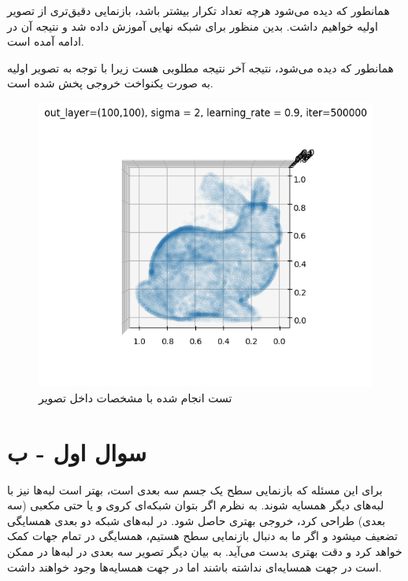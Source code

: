 \documentclass{article}
\begin{document}
\cleardoublepage

همانطور که دیده می‌شود هرچه تعداد تکرار بیشتر باشد، بازنمایی دقیق‌تری از تصویر اولیه خواهیم داشت. بدین منظور برای شبکه نهایی آموزش داده شد و نتیجه آن در ادامه آمده است.

همانطور که دیده می‌شود، نتیجه آخر نتیجه مطلوبی هست زیرا با توجه به تصویر اولیه به صورت یکنواخت خروجی پخش شده است.

\begin{figure}[!h]
    \centering\includegraphics[scale=.65]{./p1-18}
    \caption{تست انجام شده با مشخصات داخل تصویر}\label{fig.118}
\end{figure}

\cleardoublepage

\section{سوال اول - ب}

برای این مسئله که بازنمایی سطح یک جسم سه بعدی است، بهتر است لبه‌ها نیز با لبه‌های دیگر همسایه شوند. به نظرم اگر بتوان شبکه‌ای کروی و یا حتی مکعبی (سه بعدی) طراحی کرد، خروجی بهتری حاصل شود. در لبه‌های شبکه دو بعدی همسایگی تضعیف میشود و اگر ما به دنبال بازنمایی سطح هستیم، همسایگی در تمام جهات کمک خواهد کرد و دقت بهتری بدست می‌آید. به بیان دیگر تصویر سه بعدی در لبه‌ها در ممکن است در جهت  همسایه‌ای نداشته باشند اما در جهت  همسایه‌ها وجود خواهند داشت.


\end{document}
